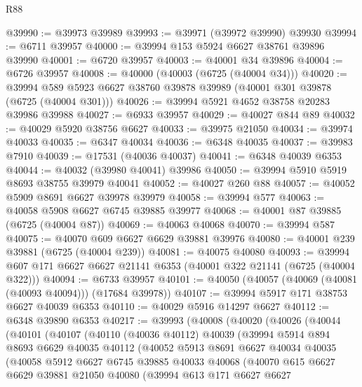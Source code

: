 \begin{lexlean}{R88}
\begin{coremodule}
@39990 := @39973 @39989
@39993 := @39971 (@39972 @39990) @39930
@39994 := @6711 @39957
@40000 := @39994 @153 @5924 @6627 @38761 @39896 @39990
@40001 := @6720 @39957
@40003 := @40001 @34 @39896
@40004 := @6726 @39957
@40008 := @40000 (@40003 (@6725 (@40004 @34)))
@40020 := @39994 @589 @5923 @6627 @38760 @39878 @39989 (@40001 @301 @39878 (@6725 (@40004 @301)))
@40026 := @39994 @5921 @4652 @38758 @20283 @39986 @39988
@40027 := @6933 @39957
@40029 := @40027 @844 @89
@40032 := @40029 @5920 @38756 @6627
@40033 := @39975 @21050
@40034 := @39974 @40033
@40035 := @6347 @40034
@40036 := @6348 @40035
@40037 := @39983 @7910
@40039 := @17531 (@40036 @40037)
@40041 := @6348 @40039 @6353
@40044 := @40032 (@39980 @40041) @39986
@40050 := @39994 @5910 @5919 @8693 @38755 @39979 @40041
@40052 := @40027 @260 @88
@40057 := @40052 @5909 @8691 @6627 @39978 @39979
@40058 := @39994 @577
@40063 := @40058 @5908 @6627 @6745 @39885 @39977
@40068 := @40001 @87 @39885 (@6725 (@40004 @87))
@40069 := @40063 @40068
@40070 := @39994 @587
@40075 := @40070 @609 @6627 @6629 @39881 @39976
@40080 := @40001 @239 @39881 (@6725 (@40004 @239))
@40081 := @40075 @40080
@40093 := @39994 @607 @171 @6627 @6627 @21141 @6353 (@40001 @322 @21141 (@6725 (@40004 @322)))
@40094 := @6733 @39957
@40101 := @40050 (@40057 (@40069 (@40081 (@40093 @40094))) (@17684 @39978))
@40107 := @39994 @5917 @171 @38753 @6627 @40039 @6353
@40110 := @40029 @5916 @14297 @6627
@40112 := @6348 @39890 @6353
@40217 := @39993
    (@40008
      (@40020
        (@40026
          (@40044
            (@40101
              (@40107
                (@40110
                  (@40036 @40112)
                  @40039
                  (@39994
                    @5914
                    @894
                    @8693
                    @6629
                    @40035
                    @40112
                    (@40052
                      @5913
                      @8691
                      @6627
                      @40034
                      @40035
                      (@40058
                        @5912
                        @6627
                        @6745
                        @39885
                        @40033
                        @40068
                        (@40070
                          @615
                          @6627
                          @6629
                          @39881
                          @21050
                          @40080
                          (@39994
                            @613
                            @171
                            @6627
                            @6627

\end{coremodule}
\end{lexlean}
